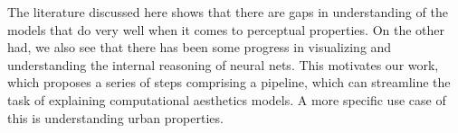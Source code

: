 \par
The literature discussed here shows that there are gaps in understanding of the models that do very well when it comes to perceptual properties. On the other had, we also see that there has been some progress in visualizing and understanding the internal reasoning of neural nets. This motivates our work, which proposes a series of steps comprising a pipeline, which can streamline the task of explaining computational aesthetics models. A more specific use case of this is understanding urban properties.